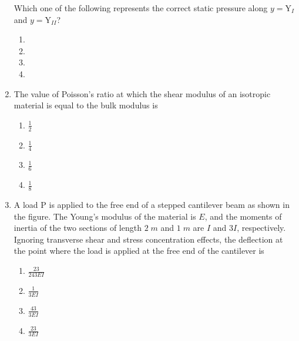 \documentclass[journal,12pt,onecolumn]{IEEEtran}
\theoremstyle{remark}
\begin{document}
\begin{enumerate}

Which one of the following represents the correct static pressure along $y=\text{Y}_I$ and $y=\text{Y}_{II}$?
\begin{enumerate}
    \item 

    \item 

    \item 
 
    \item 

\end{enumerate}
\item The value of Poisson's ratio at which the shear modulus of an isotropic material is equal to the bulk modulus is
\begin{enumerate}
    \item $\frac{1}{2}$
    \item $\frac{1}{4}$
    \item $\frac{1}{6}$
    \item $\frac{1}{8}$
\end{enumerate}
\item A load P is applied to the free end of a stepped cantilever beam as shown in the figure. The Young's modulus of the material is $E$, and the moments of inertia of the two sections of length $2\;m$ and $1\;m$ are $I$ and $3I$, respectively. Ignoring transverse shear and stress concentration effects, the deflection at the point where the load is applied at the free end of the cantilever is  

\begin{enumerate}
    \item $\frac{23}{243EI}$
    \item $\frac{1}{3EI}$
    \item $\frac{43}{3EI}$
    \item $\frac{23}{3EI}$
\end{enumerate}


\end{enumerate}
\end{document}
